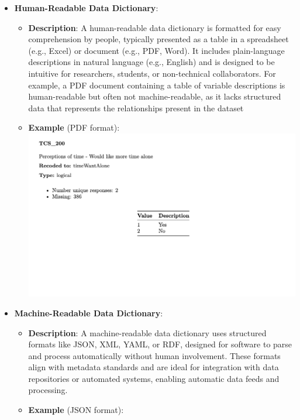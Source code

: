 \documentclass[
]{article}
\providecommand{\tightlist}{%
  \setlength{\itemsep}{0pt}\setlength{\parskip}{0pt}}
\begin{document}
\begin{itemize}
\tightlist
\item
  \textbf{Human-Readable Data Dictionary}:

  \begin{itemize}
  \tightlist
  \item
    \textbf{Description}: A human-readable data dictionary is formatted
    for easy comprehension by people, typically presented as a table in
    a spreadsheet (e.g., Excel) or document (e.g., PDF, Word). It
    includes plain-language descriptions in natural language (e.g.,
    English) and is designed to be intuitive for researchers, students,
    or non-technical collaborators. For example, a PDF document
    containing a table of variable descriptions is human-readable but
    often not machine-readable, as it lacks structured data that
    represents the relationships present in the dataset
  \item
    \textbf{Example} (PDF format):
    \includegraphics{images/4-ACT-3-datadictionaryPDF.png}
  \end{itemize}
\item
  \textbf{Machine-Readable Data Dictionary}:

  \begin{itemize}
  \tightlist
  \item
    \textbf{Description}: A machine-readable data dictionary uses
    structured formats like JSON, XML, YAML, or RDF, designed for
    software to parse and process automatically without human
    involvement. These formats align with metadata standards and are
    ideal for integration with data repositories or automated systems,
    enabling automatic data feeds and processing.
  \item
    \textbf{Example} (JSON format):
  \end{itemize}


\end{itemize}
\end{document}
